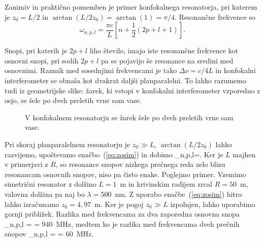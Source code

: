 Zanimiv in praktično pomemben je primer konfokalnega resonatorja,
pri katerem je $z_{0}=L/2$ in $\arctan(L/2z_{0})= \arctan(1)=\pi/4$. Resonančne frekvence
so 
\begin{equation}
\omega_{n,p,l}=\frac{\pi c}{L}\left[n+\frac{1}{2}(2p+l+1)\right].
\label{eq:omega_konf}
\end{equation}

Snopi, pri katerih je $2p+l$ liho število, imajo iste resonančne frekvence kot
osnovni snopi, pri sodih $2p+l$ pa se pojavijo še resonance na sredini
med osnovnimi. Razmik med sosednjimi frekvencami je tako $\Delta\nu=c/4L$
in konfokalni interferometer se obnaša kot dvakrat daljši planparalelni.
To lahko razumemo tudi iz geometrijske slike: žarek, ki vstopi v konfokalni
interferometer vzporedno z osjo, se šele po dveh preletih vrne sam
vase.

\begin{figure}[h]
\centering
\def\svgwidth{60truemm} 

\caption{V konfokalnem resonatorju se žarek šele po dveh preletih
vrne sam vase.}
\label{fig:Konfokalni_zarek}
\end{figure}

Pri skoraj planparalelnem 
resonatorju je $z_{0}\gg L$, $\arctan(L/2z_{0})$ lahko razvijemo, upoštevamo enačbo~(\ref{eq:zosim}) 
in dobimo
\beq
\omega_{n,p,l}=.
\eeq
Ker je $L$ majhen v primerjavi z $R$, so resonance snopov nizkega prečnega reda 
zelo blizu resonancam osnovnih snopov, niso pa čisto enake. Poglejmo primer. Vzemimo 
simetrični resonator z dolžino $L=1$~m in krivinskim radijem zrcal $R=50$~m, 
valovna dolžina pa naj bo $\lambda= 500$~nm. Z uporabo enačbe~(\ref{eq:zosim})
hitro lahko izračunamo $z_0 = 4,97$~m. Ker je pogoj $z_0\gg L$ izpolnjen, lahko uporabimo
gornji približek. Razlika med frekvencama za dva zaporedna osnovna snopa 
\beq
\Delta \omega_{n,p,l} =  = 940~\si{\mega\hertz},
\eeq
medtem ko je razlika med frekvencama dveh prečnih snopov
\beq
\Delta \omega_{n,p,l} =   = 60~\si{\mega\hertz}.
\eeq

